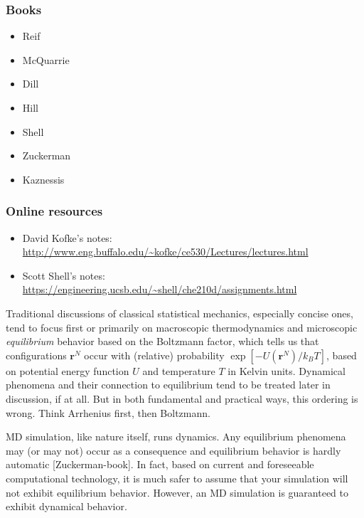 \documentclass[9pt,bestpractices]{livecoms}
\newcommand{\conf}{\mathbf{r}^N}
\begin{document}
\subsubsection{Books}
\begin{itemize}
\item Reif
\item McQuarrie
\item Dill
\item Hill
\item Shell
\item Zuckerman
\item Kaznessis
\end{itemize}
\subsubsection{Online resources}
\begin{itemize}
\item David Kofke's notes: \url{http://www.eng.buffalo.edu/~kofke/ce530/Lectures/lectures.html}
\item Scott Shell's notes: \url{https://engineering.ucsb.edu/~shell/che210d/assignments.html}
\end{itemize}

Traditional discussions of classical statistical mechanics, especially concise ones, tend to focus first or primarily on macroscopic thermodynamics and microscopic \emph{equilibrium} behavior based on the Boltzmann factor, which tells us that configurations $\conf$ occur with (relative) probability $\exp[-U(\conf)/k_B T]$, based on potential energy function $U$ and temperature $T$ in Kelvin units.  
Dynamical phenomena and their connection to equilibrium tend to be treated later in discussion, if at all.  
But in both fundamental and practical ways, this ordering is wrong.  
Think Arrhenius first, then Boltzmann.

MD simulation, like nature itself, runs dynamics.  
Any equilibrium phenomena may (or may not) occur as a consequence and equilibrium behavior is hardly automatic [Zuckerman-book].  
In fact, based on current and foreseeable computational technology, it is much safer to assume that your simulation will not exhibit equilibrium behavior.  
However, an MD simulation is guaranteed to exhibit dynamical behavior.
\end{document}
